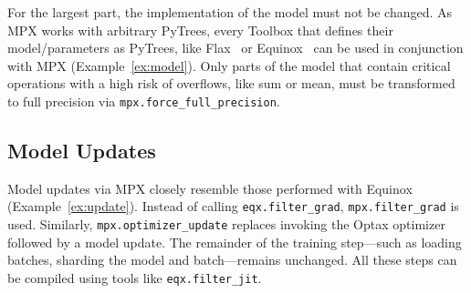 \documentclass[10pt, a4paper, logo, onecolumn, internal, copyright]{dsme}
\newcommand{\mpx}{\textsc{MPX}}
\begin{document}
For the largest part, the implementation of the model must not be changed.
As \mpx{} works with arbitrary PyTrees, every Toolbox that defines their model/parameters as PyTrees, like Flax~\citep{flax2020github} or Equinox~\citep{kidger2021equinox} can be used in conjunction with \mpx{} (Example~\ref{ex:model}). 
Only parts of the model that contain critical operations with a high risk of overflows, like sum or mean, must be transformed to full precision via \texttt{mpx.force\_full\_precision}.


\subsection{Model Updates}
\label{sec:eqxvsmpxmodelupdate}
Model updates via \mpx{} closely resemble those performed with Equinox (Example~\ref{ex:update}). 
Instead of calling \texttt{eqx.filter\_grad}, \texttt{mpx.filter\_grad} is used. Similarly, \texttt{mpx.optimizer\_update} replaces invoking the Optax optimizer followed by a model update.
The remainder of the training step—such as loading batches, sharding the model and batch—remains unchanged. 
All these steps can be compiled using tools like \texttt{eqx.filter\_jit}.
\end{document}
